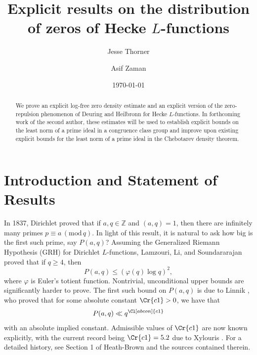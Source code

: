 \documentclass[12pt,psamsfonts]{amsart}
\title{Explicit results on the distribution of zeros of Hecke $L$-functions}
\author{Jesse Thorner}
\author{Asif Zaman}
\date{\today}
\theoremstyle{definition}
\theoremstyle{remark}
\numberwithin{equation}{section}
\theoremstyle{plain}
\theoremstyle{remark}
\renewcommand{\1}{ {\bf 1}}
\renewcommand{\pmod}[1]{\, (\mathrm{mod} {\, #1})}
\begin{document}

\maketitle
\begin{abstract}
We prove an explicit log-free zero density estimate and an explicit version of the zero-repulsion phenomenon of Deuring and Heilbronn for Hecke $L$-functions.  In forthcoming work of the second author, these estimates will be used to establish explicit bounds on the least norm of a prime ideal in a congruence class group and improve upon existing explicit bounds for the least norm of a prime ideal in the Chebotarev density theorem.
\end{abstract}




\section{Introduction and Statement of Results}

In 1837, Dirichlet proved that if $a,q\in\mathbb{Z}$ and $(a,q)=1$, then there are infinitely many primes $p\equiv a\pmod q$.  In light of this result, it is natural to ask how big is the first such prime, say $P(a,q)$?  Assuming the Generalized Riemann Hypothesis (GRH) for Dirichlet $L$-functions, Lamzouri, Li, and Soundararajan \cite{LLS} proved that if $q\geq4$, then
\begin{equation}
\label{eqn:Linnik_GRH}
P(a,q)\leq(\varphi(q)\log q)^2,
\end{equation}
where $\varphi$ is Euler's totient function.  Nontrivial, unconditional upper bounds are significantly harder to prove.  The first such bound on $P(a,q)$ is due to Linnik \cite{Linnik}, who proved that for some absolute constant $\Cr{c1}>0$, we have that 
\begin{equation}
\label{eqn:Linnik}
P(a,q)\ll q^{\Cl[abcon]{c1}}
\end{equation}
with an absolute implied constant.  Admissible values of $\Cr{c1}$ are now known explicitly, with the current record being $\Cr{c1}=5.2$ due to Xylouris \cite{Xylouris}. For a detailed history, see Section 1 of Heath-Brown \cite{HBLinnik} and the sources contained therein.
\end{document}

